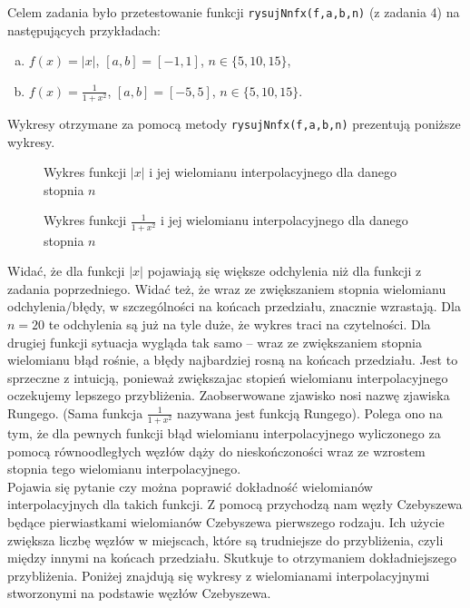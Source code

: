 \documentclass[]{article}
\begin{document}
	Celem zadania było przetestowanie funkcji \texttt{rysujNnfx(f,a,b,n)} (z zadania 4) na następujących przykładach:
	\begin{enumerate}[(a)]
		\item $f(x) = |x|$, $[a, b] = [-1,1]$, $n \in \{5,10,15\}$,
		\item $f(x) = \frac{1}{1+x^2}$, $[a, b] = [-5,5]$, $n \in \{5,10,15\}$.
	\end{enumerate}
Wykresy otrzymane za pomocą metody \texttt{rysujNnfx(f,a,b,n)} prezentują poniższe wykresy.
\begin{figure}[h]
	\centering
	\caption*{Wykres funkcji $|x|$ i jej wielomianu interpolacyjnego dla danego stopnia $n$}
	\label{fig:3}
\end{figure}		

\begin{figure}[h]
	\centering
	\caption*{Wykres funkcji $\frac{1}{1+x^2}$ i jej wielomianu interpolacyjnego dla danego stopnia $n$}
	\label{fig:4}
\end{figure}

Widać, że dla funkcji $|x|$ pojawiają się większe odchylenia niż dla funkcji z zadania poprzedniego. Widać też, że wraz ze zwiększaniem stopnia wielomianu odchylenia/błędy, w szczególności na końcach przedziału, znacznie wzrastają. Dla $n=20$ te odchylenia są już na tyle duże, że wykres traci na czytelności. Dla drugiej funkcji sytuacja wygląda tak samo -- wraz ze zwiększaniem stopnia wielomianu błąd rośnie, a błędy najbardziej rosną na końcach przedziału. Jest to sprzeczne z intuicją, ponieważ zwiększajac stopień wielomianu interpolacyjnego oczekujemy lepszego przybliżenia. Zaobserwowane zjawisko nosi nazwę zjawiska Rungego. (Sama funkcja $\frac{1}{1+x^2}$ nazywana jest funkcją Rungego). Polega ono na tym, że dla pewnych funkcji błąd wielomianu
interpolacyjnego wyliczonego za pomocą równoodległych węzłów dąży do nieskończoności wraz ze
wzrostem stopnia tego wielomianu interpolacyjnego.\\
Pojawia się pytanie czy można poprawić dokładność wielomianów interpolacyjnych dla takich funkcji. Z pomocą przychodzą nam węzły Czebyszewa będące pierwiastkami wielomianów Czebyszewa pierwszego rodzaju. Ich użycie zwiększa liczbę węzłów w miejscach, które są trudniejsze do przybliżenia, czyli między innymi na końcach przedziału. Skutkuje to otrzymaniem dokładniejszego przybliżenia. Poniżej znajdują się wykresy z wielomianami interpolacyjnymi stworzonymi na podstawie węzłów Czebyszewa.
\end{document}
